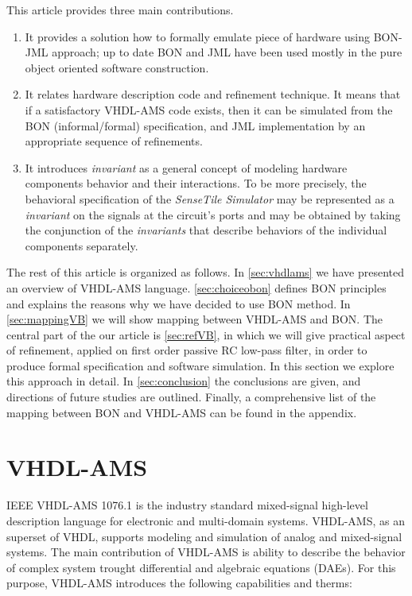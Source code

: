 \documentclass{article}
\newcommand{\STS}{\emph{SenseTile Simulator}\xspace}
\newcommand{\inv}{\emph{invariant}\xspace}
\begin{document}
This article provides three main contributions.
\begin{enumerate}
\item It provides a solution how to formally emulate piece of hardware
using BON-JML approach; up to date BON and JML have been used mostly
in the pure object oriented software construction.
\item It relates hardware description code and refinement technique.
It means that if a satisfactory VHDL-AMS code exists, then it can be
simulated from the BON (informal/formal) specification, and JML
implementation by an appropriate sequence of refinements.
\item It introduces \inv as a general concept of modeling hardware
components behavior and their interactions.  To be more precisely, the
behavioral specification of the \STS may be represented as a \inv on
the signals at the circuit's ports and may be obtained by taking the
conjunction of the \emph{invariants} that describe behaviors of the
individual components separately.
 
\end{enumerate} The rest of this article is organized as follows.  In
\autoref{sec:vhdlams} we have presented an overview of VHDL-AMS
language.  \autoref{sec:choiceobon} defines BON principles and
explains the reasons why we have decided to use BON method.  In
\autoref{sec:mappingVB} we will show mapping between VHDL-AMS and BON.
The central part of the our article is \autoref{sec:refVB}, in which
we will give practical aspect of refinement, applied on first order
passive RC low-pass filter, in order to produce formal specification
and software simulation. In this section we explore this approach in
detail.  In \autoref{sec:conclusion} the conclusions are given, and
directions of future studies are outlined. Finally, a comprehensive
list of the mapping between BON and VHDL-AMS can be found in the
appendix.
 


\section{VHDL-AMS}
\label{sec:vhdlams} IEEE VHDL-AMS 1076.1 is the industry standard
mixed-signal high-level description language for electronic and
multi-domain systems. VHDL-AMS, as an superset of VHDL, supports
modeling and simulation of analog and mixed-signal systems. The main
contribution of VHDL-AMS is ability to describe the behavior of
complex system trought differential and algebraic equations
(DAEs). For this purpose, VHDL-AMS introduces the following
capabilities and therms:
\end{document}
